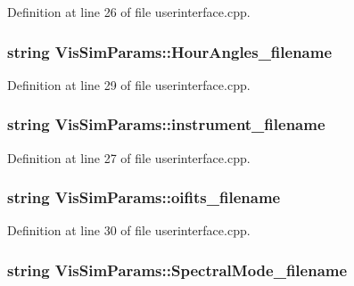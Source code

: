 Definition at line 26 of file userinterface.cpp.

\hypertarget{classVisSimParams_a6e44268b31963634fc2a2a6ec96c0d67}{
\subsubsection[{HourAngles\_\-filename}]{\setlength{\rightskip}{0pt plus 5cm}string {\bf VisSimParams::HourAngles\_\-filename}}}
\label{classVisSimParams_a6e44268b31963634fc2a2a6ec96c0d67}


Definition at line 29 of file userinterface.cpp.

\hypertarget{classVisSimParams_a1b39663100b7215fc5d8f61d30d85044}{
\subsubsection[{instrument\_\-filename}]{\setlength{\rightskip}{0pt plus 5cm}string {\bf VisSimParams::instrument\_\-filename}}}
\label{classVisSimParams_a1b39663100b7215fc5d8f61d30d85044}


Definition at line 27 of file userinterface.cpp.

\hypertarget{classVisSimParams_ab5550741409f4dbfe5d601194fe7be4b}{
\subsubsection[{oifits\_\-filename}]{\setlength{\rightskip}{0pt plus 5cm}string {\bf VisSimParams::oifits\_\-filename}}}
\label{classVisSimParams_ab5550741409f4dbfe5d601194fe7be4b}


Definition at line 30 of file userinterface.cpp.

\hypertarget{classVisSimParams_a5b4b6a34093cd8d538fa32e159477d8e}{
\subsubsection[{SpectralMode\_\-filename}]{\setlength{\rightskip}{0pt plus 5cm}string {\bf VisSimParams::SpectralMode\_\-filename}}}
\label{classVisSimParams_a5b4b6a34093cd8d538fa32e159477d8e}


